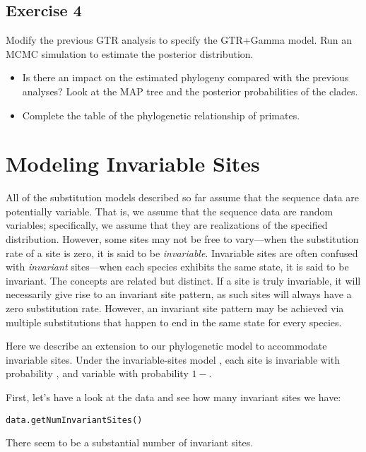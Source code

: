 \subsection{Exercise 4}

Modify the previous GTR analysis to specify the GTR+Gamma model. 
Run an MCMC simulation to estimate the posterior distribution.
\begin{itemize}
\item Is there an impact on the estimated phylogeny compared with the previous analyses? 
	Look at the MAP tree and the posterior probabilities of the clades.
\item Complete the table of the phylogenetic relationship of primates.
\end{itemize}



\newpage
\section{Modeling Invariable Sites}
All of the substitution models described so far assume that the sequence data are potentially variable.
That is, we assume that the sequence data are random variables; specifically, we assume that they are realizations of the specified  distribution. 
However, some sites may not be free to vary---when the substitution rate of a site is zero, it is said to be \emph{invariable}.
Invariable sites are often confused with \emph{invariant} sites---when each species exhibits the same state, it is said to be invariant.
The concepts are related but distinct.
If a site is truly invariable, it will necessarily give rise to an invariant site pattern, as such sites will always have a zero substitution rate.
However, an invariant site pattern may be achieved via multiple substitutions that happen to end in the same state for every species.

Here we describe an extension to our phylogenetic model to accommodate invariable sites.
Under the invariable-sites model \citep[][]{Hasegawa1985}, each site is invariable with probability , and variable with probability $1-$.

First, let's have a look at the data and see how many invariant sites we have:
{\tt \begin{snugshade*}
\begin{lstlisting}
data.getNumInvariantSites()
\end{lstlisting}
\end{snugshade*}}
There seem to be a substantial number of invariant sites.

